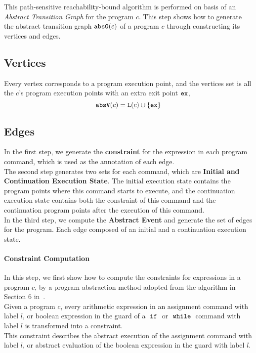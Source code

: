 This path-sensitive reachability-bound algorithm
is performed on basis of an \emph{Abstract Transition Graph} for the program $c$.
This step shows how to generate the abstract transition graph $\mathtt{abs}{\mathtt{G}}(c)$ of a
program $c$ through constructing its vertices and edges.

\subsection{Vertices}
\label{sec:abs_prog-vertex}
Every 
vertex corresponds to a program execution point, 
and the vertices set is all the $c$'s program execution points with an extra exit point ${\mathtt{ex}}$, 
\[ 
  \mathtt{abs}{\mathtt{V}}(c) = \mathtt{L}(c)\cup\{{\mathtt{ex}}\}
  \]

\subsection{Edges}
\label{sec:abs_prog-edge}
  In the first step, we generate the \textbf{constraint}
  for the expression in each program command,
  which is used as the annotation of each edge.
  \\
The second step generates two sets for each command, which are \textbf{Initial and Continuation Execution State}. 
  The initial execution state contains the
  program points where this command {starts} to execute, 
  and the continuation execution state contains both the constraint of this command
  and the continuation program points after the execution of this command.
  \\ 
  In the third step, we compute the \textbf{Abstract Event} and generate the set of edges for the program.
  Each edge composed of an initial and a continuation execution state.
%
\paragraph{Constraint Computation}
In this step, we first show how to compute the constraints for expressions in a program $c$,
by a program abstraction method adopted from the
algorithm in Section 6 in~\cite{SinnZV17}.
\\
Given a program $c$,
every arithmetic expression in an assignment command with label $l$,
or boolean expression in the guard of a $\;\mathtt{if}\;$ or $\;\mathtt{while}\;$ command with label $l$
is transformed into a constraint.
\\
This constraint describes the abstract execution of the assignment command with label $l$,
or abstract evaluation of the boolean expression in the guard with label $l$.

